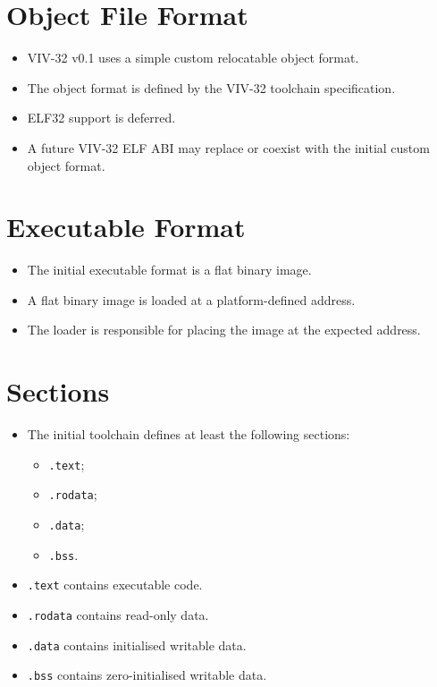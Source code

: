 \section{Object File Format}

\begin{itemize}
  \item VIV-32 v0.1 uses a simple custom relocatable object format.
  \item The object format is defined by the VIV-32 toolchain specification.
  \item ELF32 support is deferred.
  \item A future VIV-32 ELF ABI may replace or coexist with the initial custom object format.
\end{itemize}

\section{Executable Format}

\begin{itemize}
  \item The initial executable format is a flat binary image.
  \item A flat binary image is loaded at a platform-defined address.
  \item The loader is responsible for placing the image at the expected address.
\end{itemize}

\section{Sections}

\begin{itemize}
  \item The initial toolchain defines at least the following sections:
  \begin{itemize}
    \item \texttt{.text};
    \item \texttt{.rodata};
    \item \texttt{.data};
    \item \texttt{.bss}.
  \end{itemize}
  \item \texttt{.text} contains executable code.
  \item \texttt{.rodata} contains read-only data.
  \item \texttt{.data} contains initialised writable data.
  \item \texttt{.bss} contains zero-initialised writable data.
\end{itemize}

